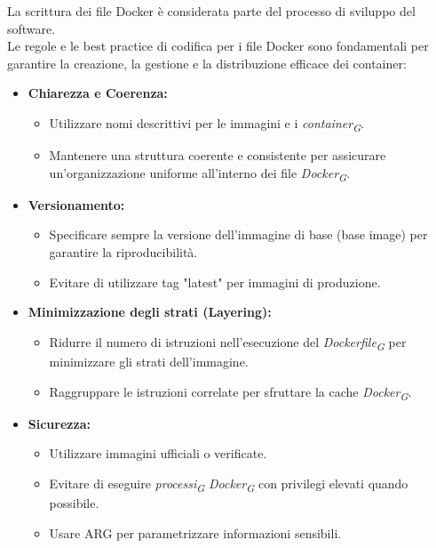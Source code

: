 La scrittura dei file Docker è considerata parte del processo di sviluppo del software. \\
Le regole e le best practice di codifica per i file Docker sono fondamentali per garantire la creazione, la gestione e la distribuzione efficace dei container:
\begin{itemize}
    \item \textbf{Chiarezza e Coerenza:}
    \begin{itemize}
        \item Utilizzare nomi descrittivi per le immagini e i \textit{container}\textsubscript{\textit{G}}.
        \item Mantenere una struttura coerente e consistente per assicurare un'organizzazione uniforme all'interno dei file \textit{Docker}\textsubscript{\textit{G}}.
    \end{itemize}

\item \textbf{Versionamento:}
    \begin{itemize}
        \item Specificare sempre la versione dell'immagine di base (base image) per garantire la riproducibilità.
        \item Evitare di utilizzare tag "latest" per immagini di produzione.
    \end{itemize}

\item \textbf{Minimizzazione degli strati (Layering):}
    \begin{itemize}
        \item Ridurre il numero di istruzioni nell'esecuzione del \textit{Dockerfile}\textsubscript{\textit{G}} per minimizzare gli strati dell'immagine.
        \item Raggruppare le istruzioni correlate per sfruttare la cache \textit{Docker}\textsubscript{\textit{G}}.
    \end{itemize}

\item \textbf{Sicurezza:}
    \begin{itemize}
        \item Utilizzare immagini ufficiali o verificate.
        \item Evitare di eseguire \textit{processi}\textsubscript{\textit{G}} \textit{Docker}\textsubscript{\textit{G}} con privilegi elevati quando possibile.
        \item Usare ARG per parametrizzare informazioni sensibili.
    \end{itemize}


\end{itemize}
